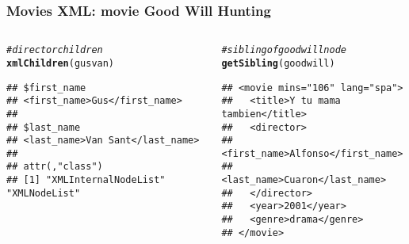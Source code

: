 \documentclass[12pt]{beamer}\usepackage[]{graphicx}\usepackage[]{color}
\makeatletter
\newcommand{\hlcom}[1]{\textcolor[rgb]{0.678,0.584,0.686}{\textit{#1}}}%
\newcommand{\hlstd}[1]{\textcolor[rgb]{0.345,0.345,0.345}{#1}}%
\newcommand{\hlkwd}[1]{\textcolor[rgb]{0.737,0.353,0.396}{\textbf{#1}}}%
\newenvironment{kframe}{%
 \def\at@end@of@kframe{}%
 \ifinner\ifhmode%
  \def\at@end@of@kframe{\end{minipage}}%
  \begin{minipage}{\columnwidth}%
 \fi\fi%
 \def\FrameCommand##1{\hskip\@totalleftmargin \hskip-\fboxsep
 \colorbox{shadecolor}{##1}\hskip-\fboxsep
     \hskip-\linewidth \hskip-\@totalleftmargin \hskip\columnwidth}%
 \MakeFramed {\advance\hsize-\width
   \@totalleftmargin\z@ \linewidth\hsize
   \@setminipage}}%
 {\par\unskip\endMakeFramed%
 \at@end@of@kframe}
\newenvironment{knitrout}{}{} %
\makeatother
\begin{document}

\begin{frame}[fragile]
\frametitle{Movies XML: movie Good Will Hunting}

\begin{columns}[t]
\begin{column}{0.5\textwidth}
\begin{knitrout}\tiny
{}\color{fgcolor}\begin{kframe}
\begin{alltt}
\hlcom{# director children}
\hlkwd{xmlChildren}\hlstd{(gusvan)}
\end{alltt}
\begin{verbatim}
## $first_name
## <first_name>Gus</first_name> 
## 
## $last_name
## <last_name>Van Sant</last_name> 
## 
## attr(,"class")
## [1] "XMLInternalNodeList" "XMLNodeList"
\end{verbatim}
\end{kframe}
\end{knitrout}
\end{column}

\begin{column}{0.5\textwidth}
\begin{knitrout}\tiny
{}\color{fgcolor}\begin{kframe}
\begin{alltt}
\hlcom{# sibling of goodwill node}
\hlkwd{getSibling}\hlstd{(goodwill)}
\end{alltt}
\begin{verbatim}
## <movie mins="106" lang="spa">
##   <title>Y tu mama tambien</title>
##   <director>
##     <first_name>Alfonso</first_name>
##     <last_name>Cuaron</last_name>
##   </director>
##   <year>2001</year>
##   <genre>drama</genre>
## </movie>
\end{verbatim}
\end{kframe}
\end{knitrout}
\end{column}
\end{columns}

\end{frame}


\begin{frame}
\begin{center}
\Huge{}
\end{center}
\end{frame}
\end{document}
